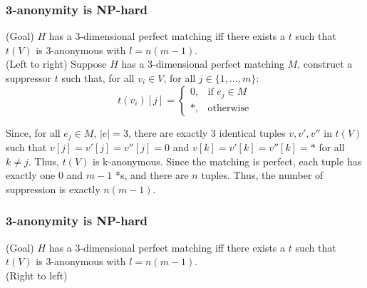 \documentclass{beamer}
\begin{document}
\begin{frame}
\frametitle{3-anonymity is NP-hard}
\alert{(Goal)} $H$ has a 3-dimensional perfect matching iff there exists a $t$ such that $t(V)$ is 3-anonymous with $l = n(m-1)$.\\
\alert{(Left to right)} Suppose $H$ has a 3-dimensional perfect matching $M$, construct a suppressor $t$ such that, for all $v_i \in V$, for all $j \in \{1,...,m\}$:
$$
t(v_{i})[j] =
\begin{cases}
    0, & \text{if } e_j \in M\\
    *, & \text{otherwise}
\end{cases}
$$

Since, for all $e_j \in M$, $|e| = 3$, there are exactly 3 identical tuples $v, v', v''$ in $t(V)$ such that $v[j] = v'[j] = v''[j] = 0$ and $v[k] = v'[k] = v''[k] = *$ for all $k \neq j$. Thus, $t(V)$ is k-anonymous. Since the matching is perfect, each tuple has exactly one $0$ and $m-1$ *s, and there are $n$ tuples. Thus, the number of suppression is exactly $n(m-1)$.
\end{frame}

\begin{frame}
\frametitle{3-anonymity is NP-hard}
\alert{(Goal)} $H$ has a 3-dimensional perfect matching iff there exists a $t$ such that $t(V)$ is 3-anonymous with $l = n(m-1)$.\\
\alert{(Right to left)}

\end{frame}
\end{document}
